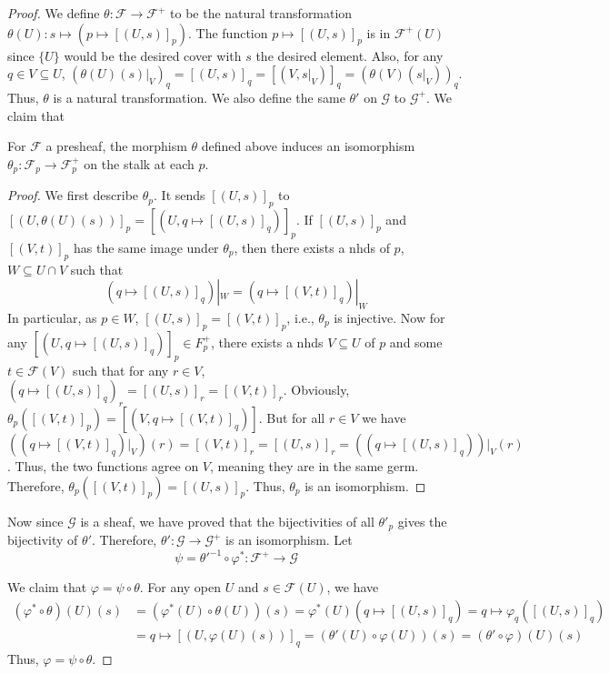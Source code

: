 \documentclass[12pt,letter]{article}
\begin{document}
\begin{proof}
	We define $\theta:\mathscr F\to\mathscr F^+$ to be the natural transformation $\theta(U):s\mapsto (p\mapsto [(U, s)]_p)$. The function $p\mapsto [(U, s)]_p$ is in $\mathscr F^+(U)$ since $\{U\}$ would be the desired cover with $s$ the desired element. Also, for any $q\in V\subseteq U$, $\left(\theta (U)(s)|_V\right)_q=[(U, s)]_q=[(V, s|_V)]_q=\left(\theta(V)(s|_V)\right)_q$. Thus, $\theta$ is a natural transformation. We also define the same $\theta'$ on $\mathscr G$ to $\mathscr G^+$. We claim that
	\begin{lemma}\label{l122}
	For $\mathscr F$ a presheaf, the morphism $\theta$ defined above induces an isomorphism $\theta_p:\mathscr F_p\to \mathscr F_p^+$ on the stalk at each $p$.
	\end{lemma}
	\begin{proof}
	We first describe $\theta_p$. It sends $[(U, s)]_p$ to $[(U, \theta(U)(s))]_p=[(U, q\mapsto [(U, s)]_q)]_p$. If $[(U, s)]_p$ and $[(V, t)]_p$ has the same image under $\theta_p$, then there exists a nhds of $p$, $W\subseteq U\cap V$ such that
	\[(q\mapsto [(U, s)]_q)|_W=(q\mapsto [(V, t)]_q)|_W\]
	In particular, as $p\in W$, $[(U, s)]_p=[(V, t)]_p$, i.e., $\theta_p$ is injective. Now for any $[(U, q\mapsto [(U, s)]_q)]_p\in F_p^+$, there exists a nhds $V\subseteq U$ of $p$ and some $t\in \mathcal F(V)$ such that for any $r\in V$,$(q\mapsto [(U, s)]_q)_r=[(U, s)]_r=[(V, t)]_r$. Obviously, $\theta_p([(V, t)]_p)=[(V, q\mapsto [(V, t)]_q)]$. But for all $r\in V$ we have $\left((q\mapsto [(V, t)]_q)|_V\right)(r)=[(V, t)]_r=[(U, s)]_r=\left((q\mapsto [(U, s)]_q)\right)|_V(r)$. Thus, the two functions agree on $V$, meaning they are in the same germ. Therefore, $\theta_p([(V, t)]_p)=[(U, s)]_p$. Thus, $\theta_p$ is an isomorphism.
	\end{proof}
	
	Now since $\mathscr G$ is a sheaf, we have proved that the bijectivities of all $\theta'_p$ gives the bijectivity of $\theta'$. Therefore, $\theta':\mathscr G\to\mathscr G^+$ is an isomorphism. Let
	\[\psi=\theta'^{-1}\circ \varphi^*:\mathscr F^+\to\mathscr G\]
	
	We claim that $\varphi=\psi\circ \theta$. For any open $U$ and $s\in\mathscr F(U)$, we have
	\begin{align*}
	(\varphi^*\circ\theta)(U)(s)&=(\varphi^*(U)\circ\theta(U))(s)=\varphi^*(U)(q\mapsto[(U, s)]_q)=q\mapsto\varphi_q([(U, s)]_q)\\
	&=q\mapsto[(U, \varphi(U)(s))]_q=(\theta'(U)\circ\varphi(U))(s)=(\theta'\circ\varphi)(U)(s)
	\end{align*}
	Thus, $\varphi=\psi\circ\theta$.
	

\end{proof}
\end{document}
